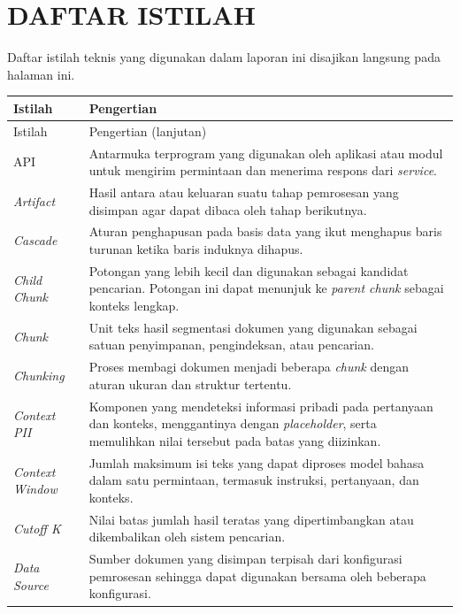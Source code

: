 \clearpage
\chapter*{DAFTAR ISTILAH}

Daftar istilah teknis yang digunakan dalam laporan ini disajikan langsung pada
halaman ini.

\begingroup
\footnotesize
\renewcommand{\arraystretch}{1.08}
\setlength{\tabcolsep}{5pt}
\begin{longtable}{@{}>{\RaggedRight\arraybackslash}p{3.7cm}>{\RaggedRight\arraybackslash}p{\dimexpr\textwidth-3.7cm-2\tabcolsep\relax}@{}}
\toprule
Istilah & Pengertian \\
\midrule
\endfirsthead
\toprule
Istilah & Pengertian (lanjutan) \\
\midrule
\endhead
\bottomrule
\endfoot
API & Antarmuka terprogram yang digunakan oleh aplikasi atau modul untuk mengirim permintaan dan menerima respons dari \emph{service}. \\
\textit{Artifact} & Hasil antara atau keluaran suatu tahap pemrosesan yang disimpan agar dapat dibaca oleh tahap berikutnya. \\
\textit{Cascade} & Aturan penghapusan pada basis data yang ikut menghapus baris turunan ketika baris induknya dihapus. \\
\textit{Child Chunk} & Potongan yang lebih kecil dan digunakan sebagai kandidat pencarian. Potongan ini dapat menunjuk ke \textit{parent chunk} sebagai konteks lengkap. \\
\textit{Chunk} & Unit teks hasil segmentasi dokumen yang digunakan sebagai satuan penyimpanan, pengindeksan, atau pencarian. \\
\textit{Chunking} & Proses membagi dokumen menjadi beberapa \textit{chunk} dengan aturan ukuran dan struktur tertentu. \\
\textit{Context PII} & Komponen yang mendeteksi informasi pribadi pada pertanyaan dan konteks, menggantinya dengan \textit{placeholder}, serta memulihkan nilai tersebut pada batas yang diizinkan. \\
\textit{Context Window} & Jumlah maksimum isi teks yang dapat diproses model bahasa dalam satu permintaan, termasuk instruksi, pertanyaan, dan konteks. \\
\textit{Cutoff K} & Nilai batas jumlah hasil teratas yang dipertimbangkan atau dikembalikan oleh sistem pencarian. \\
\textit{Data Source} & Sumber dokumen yang disimpan terpisah dari konfigurasi pemrosesan sehingga dapat digunakan bersama oleh beberapa konfigurasi. \\

\end{longtable}
